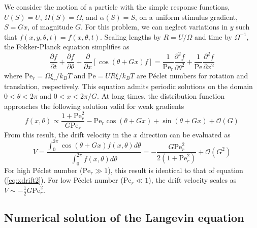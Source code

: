 \begin{appendices}
We consider the motion of a particle with the simple response functions, $U(S)=U$, $\Omega(S)=\Omega$, and  $\alpha(S)=S$, on a uniform stimulus gradient, $S=G x$, of magnitude $G$. For this problem, we can neglect variations in $y$ such that $f(x,y,\theta,t)=f(x,\theta,t)$.  Scaling lengths by $R=U/\Omega$ and time by $\Omega^{-1}$, the Fokker-Planck equation simplifies as
\begin{equation}
    \frac{\partial f}{\partial t} + \frac{\partial f}{\partial \theta} + \frac{\partial}{\partial x}\left[\cos(\theta+Gx)f\right] =  \frac{1}{\text{Pe}_r}\frac{\partial^2f}{\partial \theta^2} + \frac{1}{\text{Pe}}\frac{\partial^2 f}{\partial x^2}
\end{equation}
where $\text{Pe}_r = \Omega \xi_r/k_B T$ and $\text{Pe}=U R \xi/k_B T$ are P\'eclet numbers for rotation and translation, respectively.  This equation admits periodic solutions on the domain $0<\theta<2\pi$ and $0<x<2\pi/G$. At long times, the distribution function approaches the following solution valid for weak gradients
\begin{equation}
    f(x,\theta) \propto \frac{1 + \text{Pe}_r^2}{G\text{Pe}_r} - \text{Pe}_r \cos (\theta + G x) + \sin (\theta + G x) + \mathcal{O}(G)
\end{equation}
From this result, the drift velocity in the $x$ direction can be evaluated as 
\begin{equation}
    V = \frac{\int_0^{2\pi} \cos(\theta+G x)f(x,\theta) d\theta}{\int_0^{2\pi} f(x,\theta) d\theta} = -\frac{G \text{Pe}_r^2}{2 (1 + \text{Pe}_r^2)}  + \mathcal{O}(G^2)
\end{equation}
For high P\'eclet number ($\text{Pe}_r\gg1$), this result is identical to that of equation (\ref{eq:xdrift2}).  For low P\'eclet number ($\text{Pe}_r\ll 1$), the drift velocity scales as $V\sim -\tfrac{1}{2}G\text{Pe}_r^2$.

\subsection{Numerical solution of the Langevin equation}


\end{appendices}
